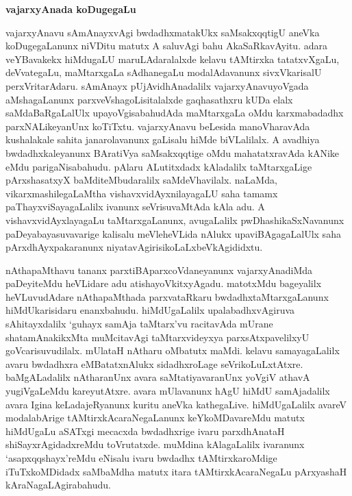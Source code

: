 \bigskip
\begin{center}
{\Large\bf vajarxyAnada koDugegaLu}
\end{center}

vajarxyAnavu sAmAnayxvAgi bwdadhxmatakUkx saMsakxqqtigU aneVka koDuge\-gaLanunx niVDitu matutx A saluvAgi bahu AkaSaRkavAyitu. adara veYBavakekx hiMdugaLU maruLAdaralalxde kelavu tAMtirxka tatatxvXgaLu, deVvategaLu, maMtarxgaLa sAdhanegaLu modalA\-davanunx sivxVkarisalU perxVritarAdaru. sAmAnayx pUjAvidhAnadalilx vajarxyAnavu\break yoVgada aMshagaLanunx parxveVshagoLisitalalxde gaqhasathxru kUDa elalx saMdaBaRgaLalUlx upa\-yoVgisabahudAda maMtarxgaLa oMdu karxmabadadhx parxNALikeyanUnx koTiTxtu. vajarx\break\-yAnavu beLesida manoVharavAda kushalakale sahita janarolavanunx gaLisalu hiMde biVLalilalx. A avadhiya bwdadhxkaleyanunx BAratiVya saMsakxqqtige oMdu mahatatxravAda kANike eMdu parigaNisabahudu. pAlaru ALutitxdadx kAladalilx taMtarxgaLige pArxshasatxyX baMditeMbudaralilx saMdeVhavilalx. naLaMda, vikarxmashilegaLaMtha vishavxvidAyxnilayagaLU saha tamamx paThayxviSayagaLalilx ivanunx seVrisuvaMtAda kAla adu. A vishavxvidAyxlayagaLu taMtarxgaLanunx, avugaLalilx pwDhashikaSxNavanunx paDeyabayasuvavarige kalisalu meVle\break heVLida nAlukx upaviBAgagaLalUlx saha pArxdhAyxpakaranunx niyatavAgirisikoLaLxbeVkAgi\-didxtu.

nAthapaMthavu tananx parxtiBAparxcoVdaneyanunx vajarxyAnadiMda paDeyiteMdu heVLi\-dare adu atishayoVkitxyAgadu. matotxMdu bageyalilx heVLuvudAdare nAthapaMthada parxvataRkaru bwdadhxtaMtarxgaLanunx hiMdUkarisidaru enanxbahudu. hiMdUgaLalilx upalabadhxvAgiruva sAhitayxdalilx `guhayx samAja taMtarx'vu racitavAda mUrane shatamAnakikxMta muMcitavAgi taMtarxvideyxya parxsAtxpavelilxyU goVcarisuvudilalx. mUlataH nAtharu oMbatutx maMdi. kelavu samayagaLalilx avaru bwdadhxra eMBatatxnAlukx sidadhxroLage seVrikoLuLxtAtxre. baMgALadalilx nAtharanUnx avara saMtatiyavaranUnx yoVgiV athavA yugiVgaLeMdu kareyutAtxre. avara mUlavanunx hAgU hiMdU samAjadalilx avara Igina keLadajeRyanunx kuritu aneVka kathegaLive. hiMdUgaLalilx avareV modalabArige tAMtirxkAcaraNegaLanunx keYkoMDavareMdu matutx hiMdUgaLu aSATxgi mecacxda bwdadhxrige ivaru parxdhAnataH shiSayxrAgidadxreMdu toVrutatxde. muMdina kAlagaLalilx ivaranunx `asapxqqshayx'reMdu eNisalu ivaru bwdadhx tAMtirxkaroMdige iTuTxkoMDidadx saMbaMdha matutx itara tAMtirxkAcaraNegaLu pArxyashaH kAraNagaLAgirabahudu.

